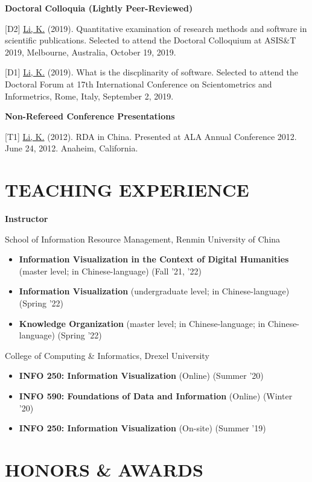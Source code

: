 \documentclass[margin, 10pt]{res} %
\begin{document}
\begin{resume}
\textbf{Doctoral Colloquia (Lightly Peer-Reviewed)}

[D2] \underline{Li, K.} (2019). Quantitative examination of research methods and software in scientific publications. Selected to attend the Doctoral Colloquium at ASIS\&T 2019, Melbourne, Australia, October 19, 2019.

[D1] \underline{Li, K.} (2019). What is the discplinarity of software. Selected to attend the Doctoral Forum at 17th International Conference on Scientometrics and Informetrics, Rome, Italy, September 2, 2019.

\textbf{Non-Refereed Conference Presentations}

[T1] \underline{Li, K.} (2012). RDA in China. Presented at ALA Annual Conference 2012. June 24, 2012. Anaheim, California.

\section{TEACHING EXPERIENCE}

\textbf{Instructor}

School of Information Resource Management, Renmin University of China
\begin{itemize}
\item \textbf{Information Visualization in the Context of Digital Humanities} (master level; in Chinese-language) (Fall '21, '22)
\item \textbf{Information Visualization} (undergraduate level; in Chinese-language) (Spring '22)
\item \textbf{Knowledge Organization} (master level; in Chinese-language; in Chinese-language) (Spring '22)
\end{itemize}

College of Computing \& Informatics, Drexel University

\begin{itemize}
\item \textbf{INFO 250: Information Visualization} (Online) (Summer '20)
\item \textbf{INFO 590: Foundations of Data and Information} (Online) (Winter '20)
\item \textbf{INFO 250: Information Visualization} (On-site) (Summer '19)
\end{itemize}

\section{HONORS \& AWARDS}


\end{resume}
\end{document}
